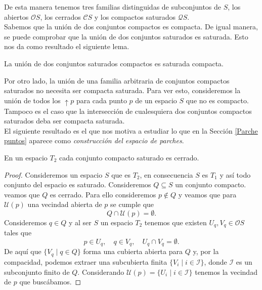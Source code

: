 De esta manera tenemos tres familias distinguidas de subconjuntos de $S$, los abiertos $\mathcal{O}S$, los cerrados $\mathcal{C}S$ y los compactos saturados $\mathcal{Q}S$.\\

Sabemos que la unión de dos conjuntos compactos es compacta. De igual manera, se puede comprobar que la unión de dos conjuntos saturados es saturada. Esto nos da como resultado el siguiente lema.

\begin{lem}\label{Union compactosaturado}
    La unión de dos conjuntos saturados compactos es saturada compacta.
\end{lem}

Por otro lado, la unión de una familia arbitraria de conjuntos compactos saturados no necesita ser compacta saturada. Para ver esto, consideremos la unión de todos los $\uparrow{p}$ para cada punto $p$ de un espacio $S$ que no es compacto.\\

Tampoco es el caso que la intersección de cualesquiera dos conjuntos compactos saturados deba ser compacta saturada.\\

El siguiente resultado es el que nos motiva a estudiar lo que en la Sección \ref{Parche puntos} aparece como \emph{construcción del espacio de parches}.

\begin{lem}\label{compacto saturado}
    En un espacio $T_2$ cada conjunto compacto saturado es cerrado.
\end{lem}

\begin{proof}
    Consideremos un espacio $S$ que es $T_2$, en consecuencia $S$ es $T_1$ y así todo conjunto del espacio es saturado. Consideremos $Q\subseteq S$ un conjunto compacto. veamos que $Q$ es cerrado. Para ello consideremos $p\notin Q$ y veamos que para $\mathcal{U}(p)$ una vecindad abierta de $p$ se cumple que 
    \[
    Q\cap \mathcal{U}(p)=\emptyset.
    \]
    Consideremos $q\in Q$ y al ser $S$ un espacio $T_2$ tenemos que existen $U_q, V_q\in \mathcal{O}S$ tales que 
    \[
    p\in U_q,\quad q\in V_q, \quad U_q\cap V_q=\emptyset.
    \]
    De aquí que $\{V_q\mid q\in Q\}$ forma una cubierta abierta para $Q$ y, por la compacidad, podemos extraer una subcubierta finita $\{V_i\mid i\in \mathcal{I}\}$, donde $\mathcal{I}$ es un subconjunto finito de $Q$. Considerando $\mathcal{U}(p)=\{U_i\mid i\in \mathcal{I}\}$ tenemos la vecindad de $p$ que buscábamos.
\end{proof}

